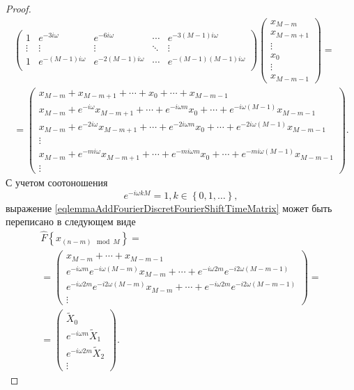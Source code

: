 \begin{proof}
\begin{eqnarray}
\begin{pmatrix}
1 & e^{-3 i \omega} & e^{-6 i \omega} & \cdots & 
e^{-3 \left( M - 1 \right) i \omega} \\
\vdots & \vdots & \vdots & \ddots & \vdots \\
1 & e^{-\left( M - 1 \right) i \omega} & e^{-2\left( M - 1 \right) i \omega} & \cdots & 
e^{- \left( M - 1 \right)\left( M - 1 \right) i \omega} \\
\end{pmatrix}
\begin{pmatrix}
x_{M - m} \\
x_{M - m + 1}\\ 
\vdots \\
x_0 \\
\vdots \\
x_{M - m - 1}
\end{pmatrix} = 
\nonumber \\
=
\begin{pmatrix}
x_{M - m} + x_{M - m + 1} + \cdots + x_0 + \cdots +
x_{M - m - 1}\\
x_{M - m} + 
e^{-i \omega} x_{M - m + 1} + 
\cdots + 
e^{-i \omega m  } x_0 + 
\cdots +
e^{-i \omega \left( M - 1 \right) } x_{M - m - 1}\\ 
x_{M - m} + 
e^{-2 i \omega} x_{M - m + 1} + 
\cdots + 
e^{-2 i \omega m  } x_0 + 
\cdots +
e^{-2 i \omega \left( M - 1 \right) } x_{M - m - 1}\\ 
\vdots \\
x_{M - m} + 
e^{-m i \omega} x_{M - m + 1} + 
\cdots + 
e^{-m i \omega m  } x_0 + 
\cdots +
e^{-m i \omega \left( M - 1 \right) } x_{M - m - 1}\\ 
\vdots 
\end{pmatrix}.
\label{eqlemmaAddFourierDiscretFourierShiftTimeMatrix}
\end{eqnarray}
С учетом соотоношения
\[
e^{-i \omega k M} = 1, k \in \left\{0, 1, \dots \right\},
\]
выражение
\eqref{eqlemmaAddFourierDiscretFourierShiftTimeMatrix} может
быть переписано в следующем виде
\begin{eqnarray}
\hat{F}\left\{x_{\left(n - m\right) \mod M}\right\} = 
\nonumber \\
=
\begin{pmatrix}
x_{M - m} + \cdots +
x_{M - m - 1}\\
e^{-i \omega m } e^{-i \omega \left( M - m \right) } x_{M - m} + 
\cdots + 
e^{-i \omega 2 m } e^{-i 2 \omega \left( M - m - 1\right) }\\ 
e^{-i \omega 2 m } e^{-i 2 \omega \left( M - m \right) } x_{M - m} + 
\cdots + 
e^{-i \omega 2 m } e^{-i 2 \omega \left( M - m - 1\right) }\\ 
\vdots 
\end{pmatrix} = 
\nonumber \\
=
\begin{pmatrix}
\tilde{X}_0 \\
e^{-i \omega m} \tilde{X}_1 \\
e^{-i \omega 2 m} \tilde{X}_2 \\
\vdots  
\end{pmatrix}.
\nonumber
\end{eqnarray}
\end{proof}


